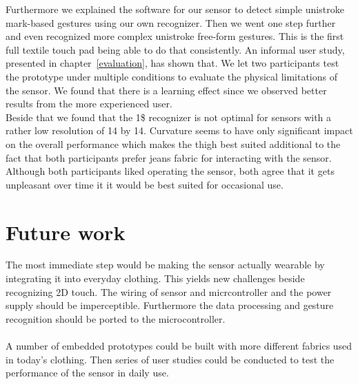 Furthermore we explained the software for our sensor to detect simple unistroke mark-based gestures using our own recognizer. Then we went one step further and even recognized more complex unistroke free-form gestures. This is the first full textile touch pad being able to do that consistently. An informal user study, presented in chapter~\ref{evaluation}, has shown that. 
We let two participants test the prototype under multiple conditions to evaluate the physical limitations of the sensor. We found that there is a learning effect since we observed better results from the more experienced user. 
\\
Beside that we found that the 1\$ recognizer is not optimal for sensors with a rather low resolution of 14 by 14. Curvature seems to have only significant impact on the overall performance which makes the thigh best suited additional to the fact that both participants prefer jeans fabric for interacting with the sensor. Although both participants liked operating the sensor, both agree that it gets unpleasant over time it it would be best suited for occasional use.

\section{Future work}
\label{summaryandfuturework.futurework}
The most immediate step would  be making the sensor actually wearable by integrating it into everyday clothing. This yields new challenges beside recognizing 2D touch. The wiring of sensor and micrcontroller and the power supply should be imperceptible. Furthermore the data processing and gesture recognition should be ported to the microcontroller. 
\\ \\
A number of embedded prototypes could be built with more different fabrics used in today's clothing. Then series of user studies could be conducted to test the performance of the sensor in daily use.
